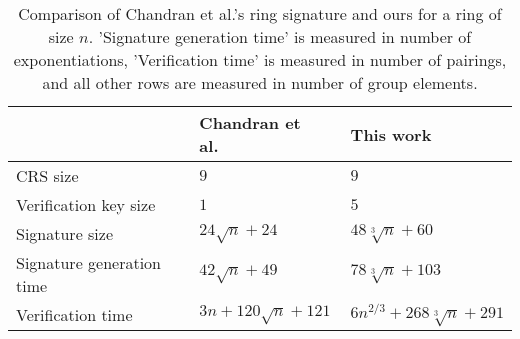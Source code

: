 \begin{table}[h]
\begin{center}
\begin{minipage}{\textwidth}
\begin{center}
\begin{tabular}{l|l|l}
                                           & Chandran et al.~\cite{ICALP:ChaGroSah07} & This work \\
\hline%
\rule{0pt}{2.5ex}CRS size                  & $9$                                       & $9$       \\ 
\rule{0pt}{2.5ex}Verification key size     & $1$                                       & $5$       \\
\rule{0pt}{2.5ex}Signature size            & $24 \sqrt{n} + 24$                        & $48 \sqrt[3]{n} + 60$\\    
\rule{0pt}{2.5ex}Signature generation time & $42 \sqrt{n} + 49$                        & $78 \sqrt[3]{n} + 103$\\
\rule{0pt}{2.5ex}Verification time         & $3 n + 120 \sqrt{n} + 121$                & $6 n^{2/3} + 268 \sqrt[3]{n} + 291$\\
\end{tabular}
\end{center}
\caption{Comparison of Chandran et al.'s ring signature and ours for a ring of size $n$. 'Signature generation time' is measured in number of exponentiations, 'Verification time' is measured in number of pairings, and all other rows are measured in number of group elements.\label{table:eff}}
\end{minipage}
\end{center}
\end{table}
